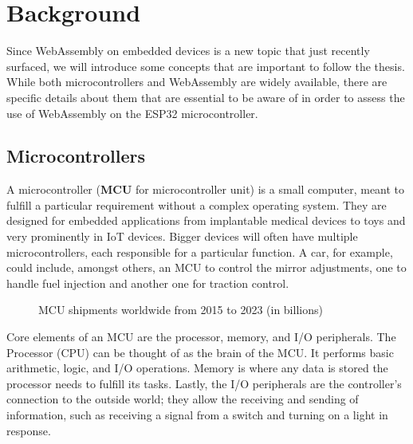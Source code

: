 
\chapter{Background}\label{chapter:background}

Since WebAssembly on embedded devices is a new topic that just recently surfaced, we will introduce some concepts that are important to follow the thesis. While both microcontrollers and WebAssembly are widely available, there are specific details about them that are essential to be aware of in order to assess the use of WebAssembly on the ESP32 microcontroller.

\section{Microcontrollers}
A microcontroller (\textbf{MCU} for microcontroller unit) is a small computer, meant to fulfill a particular requirement without a complex operating system. They are designed for embedded applications from implantable medical devices to toys and very prominently in IoT devices. Bigger devices will often have multiple microcontrollers, each responsible for a particular function. A car, for example, could include, amongst others, an MCU to control the mirror adjustments, one to handle fuel injection and another one for traction control.

\begin{figure}[h]
    \caption{MCU shipments worldwide from 2015 to 2023 (in billions) \autocite{ic_insights_microcontroller_2019}}
\end{figure}

Core elements of an MCU are the processor, memory, and I/O peripherals. The Processor (CPU) can be thought of as the brain of the MCU. It performs basic arithmetic, logic, and I/O operations. Memory is where any data is stored the processor needs to fulfill its tasks. Lastly, the I/O peripherals are the controller's connection to the outside world; they allow the receiving and sending of information, such as receiving a signal from a switch and turning on a light in response.

